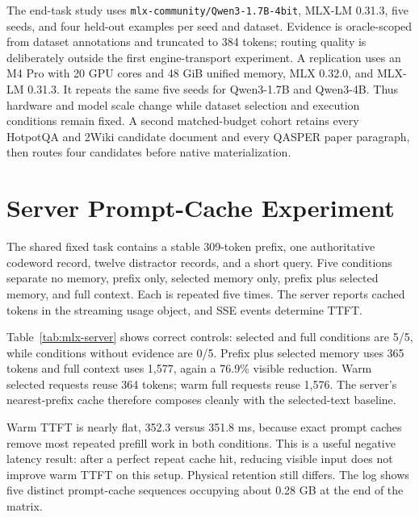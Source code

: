 \documentclass[10pt]{article}
\begin{document}
The end-task study uses \texttt{mlx-community/Qwen3-1.7B-4bit}, MLX-LM 0.31.3,
five seeds, and four held-out examples per seed and dataset. Evidence is
oracle-scoped from dataset annotations and truncated to 384 tokens; routing
quality is deliberately outside the first engine-transport experiment. A
replication uses an M4 Pro with 20 GPU cores and 48 GiB unified memory, MLX
0.32.0, and MLX-LM 0.31.3. It repeats the same five seeds for Qwen3-1.7B and
Qwen3-4B. Thus hardware and model scale change while dataset selection and
execution conditions remain fixed. A
second matched-budget cohort retains every HotpotQA and 2Wiki candidate
document and every QASPER paper paragraph, then routes four candidates before
native materialization.

\section{Server Prompt-Cache Experiment}
The shared fixed task contains a stable 309-token prefix, one authoritative
codeword record, twelve distractor records, and a short query. Five conditions
separate no memory, prefix only, selected memory only, prefix plus selected
memory, and full context. Each is repeated five times. The server reports
cached tokens in the streaming usage object, and SSE events determine TTFT.

\begin{table}[t]
\centering
\small
\caption{MLX-LM server smoke. TTFT is milliseconds; warm cached is the mean
over repeats two through five.}

\label{tab:mlx-server}
\end{table}

Table~\ref{tab:mlx-server} shows correct controls: selected and full conditions
are 5/5, while conditions without evidence are 0/5. Prefix plus selected memory
uses 365 tokens and full context uses 1,577, again a 76.9\% visible reduction.
Warm selected requests reuse 364 tokens; warm full requests reuse 1,576. The
server's nearest-prefix cache therefore composes cleanly with the selected-text
baseline.

Warm TTFT is nearly flat, 352.3 versus 351.8 ms, because exact prompt caches
remove most repeated prefill work in both conditions. This is a useful negative
latency result: after a perfect repeat cache hit, reducing visible input does
not improve warm TTFT on this setup. Physical retention still differs. The log
shows five distinct prompt-cache sequences occupying about 0.28 GB at the end
of the matrix.
\end{document}
